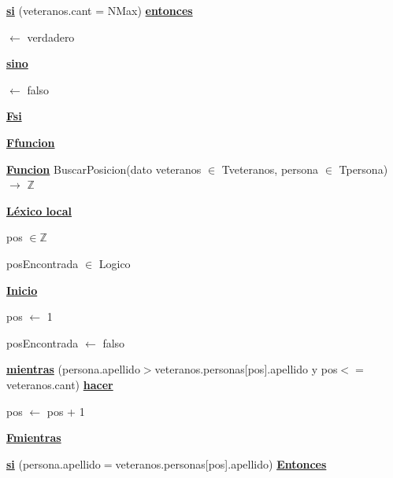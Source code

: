 \documentclass{article}
\begin{document}
            \hspace{12mm}\underline{\textbf{si}} (veteranos.cant = NMax) \underline{\textbf{entonces}}

                \hspace{16mm}$\leftarrow$ verdadero

            \hspace{12mm}\underline{\textbf{sino}}

                \hspace{16mm}$\leftarrow$ falso

            \hspace{12mm}\underline{\textbf{Fsi}}

    \hspace{4mm}\underline{\textbf{Ffuncion}}

    \vspace{4mm}

    \hspace{4mm}\underline{\textbf{Funcion}} BuscarPosicion(dato veteranos $\in$ Tveteranos, persona $\in$ Tpersona) $\rightarrow$ $\mathbb{Z}$

        \hspace{8mm}\underline{\textbf{Léxico local}}

            \hspace{12mm}pos $\in \mathbb{Z}$
            
            \hspace{12mm}posEncontrada $\in$ Logico
            
        \hspace{8mm}\underline{\textbf{Inicio}}

            \hspace{12mm}pos $\leftarrow$ 1

            \hspace{12mm}posEncontrada $\leftarrow$ falso

            \hspace{12mm}\underline{\textbf{mientras}} (persona.apellido$>$veteranos.personas[pos].apellido
            y pos$<=$veteranos.cant) \underline{\textbf{hacer}}

                \hspace{16mm}pos $\leftarrow$ pos + 1

            \hspace{12mm}\underline{\textbf{Fmientras}}

            \hspace{12mm}\underline{\textbf{si}} (persona.apellido$=$veteranos.personas[pos].apellido) \underline{\textbf{Entonces}}
\end{document}
